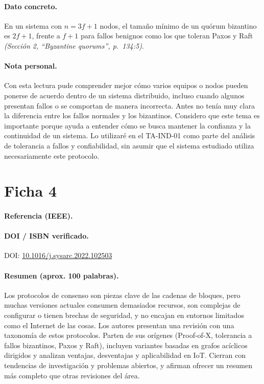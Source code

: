 \documentclass[12pt,a4paper]{article}
\begin{document}
\paragraph{Dato concreto.}
En un sistema con $n = 3f + 1$ nodos, el tamaño mínimo de un quórum bizantino es $2f + 1$, frente a $f + 1$ para fallos benignos como los que toleran Paxos y Raft \textit{(Sección 2, ``Byzantine quorums'', p.~134:5)}.

\paragraph{Nota personal.}
Con esta lectura pude comprender mejor cómo varios equipos o nodos pueden ponerse de acuerdo dentro de un sistema distribuido, incluso cuando algunos presentan fallos o se comportan de manera incorrecta. Antes no tenía muy clara la diferencia entre los fallos normales y los bizantinos. Considero que este tema es importante porque ayuda a entender cómo se busca mantener la confianza y la continuidad de un sistema. Lo utilizaré en el TA-IND-01 como parte del análisis de tolerancia a fallos y confiabilidad, sin asumir que el sistema estudiado utiliza necesariamente este protocolo.

\clearpage

\section{Ficha 4}

\paragraph{Referencia (IEEE).}

\paragraph{DOI / ISBN verificado.}
DOI: \href{https://doi.org/10.1016/j.sysarc.2022.102503}{10.1016/j.sysarc.2022.102503}

\paragraph{Resumen (aprox. 100 palabras).}
Los protocolos de consenso son piezas clave de las cadenas de bloques, pero muchas versiones actuales consumen demasiados recursos, son complejas de configurar o tienen brechas de seguridad, y no encajan en entornos limitados como el Internet de las cosas. Los autores presentan una revisión con una taxonomía de estos protocolos. Parten de sus orígenes (Proof-of-X, tolerancia a fallos bizantinos, Paxos y Raft), incluyen variantes basadas en grafos acíclicos dirigidos y analizan ventajas, desventajas y aplicabilidad en IoT. Cierran con tendencias de investigación y problemas abiertos, y afirman ofrecer un resumen más completo que otras revisiones del área.
\end{document}
